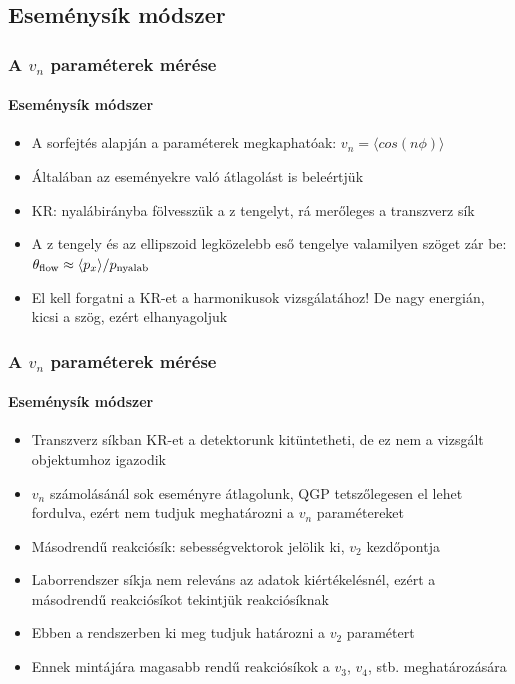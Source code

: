 \documentclass{beamer}
\begin{document}
\subsection{Eseménysík módszer}
\begin{frame}
\frametitle{A $v_n$ paraméterek mérése}
\framesubtitle{Eseménysík módszer}
\begin{itemize}
\item A sorfejtés alapján a paraméterek megkaphatóak: $v_n = \langle cos(n\phi)\rangle$
\item Általában az eseményekre való átlagolást is beleértjük
\item KR: nyalábirányba fölvesszük a z tengelyt, rá merőleges a transzverz sík
\item A z tengely és az ellipszoid legközelebb eső tengelye valamilyen szöget zár be: $\theta_{\rm flow} \approx \langle p_x \rangle/p_{\rm nyalab}$
\item El kell forgatni a KR-et a harmonikusok vizsgálatához! De nagy energián, kicsi a szög, ezért elhanyagoljuk
\end{itemize}
\end{frame}

\begin{frame}
\frametitle{A $v_n$ paraméterek mérése}
\framesubtitle{Eseménysík módszer}
\begin{itemize}
\item Transzverz síkban KR-et a detektorunk kitüntetheti, de ez nem a vizsgált objektumhoz igazodik
\item $v_n$ számolásánál sok eseményre átlagolunk, QGP tetszőlegesen el lehet fordulva, ezért nem tudjuk meghatározni a $v_n$ paramétereket
\item Másodrendű reakciósík: sebességvektorok jelölik ki, $v_2$ kezdőpontja
\item Laborrendszer síkja nem releváns az adatok kiértékelésnél, ezért a másodrendű reakciósíkot tekintjük reakciósíknak
\item Ebben a rendszerben ki meg tudjuk határozni a $v_2$ paramétert
\item Ennek mintájára magasabb rendű reakciósíkok a $v_3$, $v_4$, stb. meghatározására
\end{itemize}
\end{frame}
\end{document}
